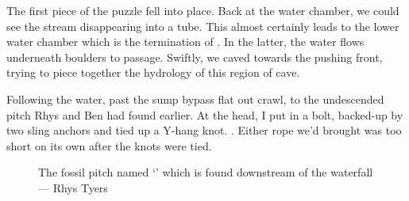 	The first piece of the puzzle fell into place. Back at the water chamber, we could see the stream disappearing into a tube. This almost certainly leads to the lower water chamber which is the termination of . In the latter, the water flows underneath boulders to  passage. Swiftly, we caved towards the pushing front, trying to piece together the hydrology of this region of cave.



 Following the water, past the sump bypass flat out crawl, to the undescended pitch Rhys and Ben had found earlier. At the head, I put in a bolt, backed-up by two sling anchors and tied up a Y-hang knot. . Either rope we'd brought was too short on its own after the knots were tied.

    \begin{figure}[h]
        \checkoddpage \ifoddpage \forcerectofloat \else \forceversofloat \fi
        \centering
        
        \caption{The fossil pitch named `\protect{}' which is found downstream of the \protect{} waterfall --- Rhys Tyers}
        \label{water chamber below helm's deep}
    \end{figure}

